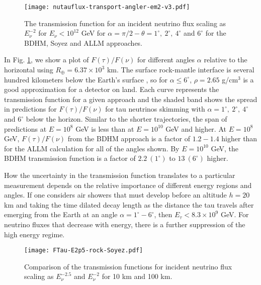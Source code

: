 \documentclass[aps,10pt,twocolumn,tightenlines]{revtex4-1}
\begin{document}
\begin{figure}[htb]
\centering
	\texttt{[image: nutauflux-transport-angler-em2-v3.pdf]}
	\caption{The transmission function for an incident neutrino flux scaling as $E_\nu^{-2}$ for $E_\nu<
	10^{12}$ GeV for $\alpha = \pi/2-\theta = 1^\circ, \ 2^\circ,\ 4^\circ$ and $6^\circ$ for the BDHM, Soyez and ALLM approaches.}
\label{fig:angle-transmission}
\end{figure}
 In Fig. \ref{fig:angle-transmission}, we show a plot of $F(\tau)/F(\nu)$ for different angles $\alpha$ relative to the horizontal using
 $R_\oplus=6.37\times 10^3$ km. The surface rock-mantle interface is several
 hundred kilometers below the Earth's surface \cite{PalomaresRuiz:2005xw}, so for $\alpha \leq 6^\circ$, $\rho=2.65$ g/cm$^3$ is a good approximation for a detector on land.
Each curve represents the transmission function for a given approach and the shaded band shows the spread in predictions for $F(\tau)/F(\nu)$
for tau neutrinos skimming with $\alpha = 1^\circ, \ 2^\circ ,\ 4^\circ$ and $6^\circ$ below the horizon.
Similar to the shorter trajectories, the span of predictions at $E=10^8$ GeV is less than at $E=10^{10}$ GeV and higher. At $E=10^8$ GeV,
$F(\tau)/F(\nu)$ from the BDHM approach is a factor of $1.2-1.4$ higher than for the ALLM calculation for all of the angles shown.
By $E=10^{10}$ GeV, the BDHM transmission function is a factor of $2.2 \ (1^\circ)$ to $13\ (6^\circ)$ higher.

How the uncertainty in the transmission function translates to a particular measurement depends on the relative importance of different
energy regions and angles. If one considers air showers that must develop before an altitude $h=20$ km and taking the time dilated decay length as the distance the tau travels after emerging from the Earth at an angle $\alpha=1^\circ-6^\circ$, then $E_\tau<8.3\times 10^9$ GeV. For neutrino fluxes
that decrease with energy, there is a further suppression of the high energy regime. 

 


\begin{figure}[htb]
\centering
	\texttt{[image: FTau-E2p5-rock-Soyez.pdf]}	
	\caption{Comparison of the transmission functions for 
incident neutrino flux scaling as $E_\nu^{-2.5}$ and $E_\nu^{-2}$ 
	 for 10 km and 100 km.
	}
\label{fig:flux-e2p5}
\end{figure}
\end{document}
